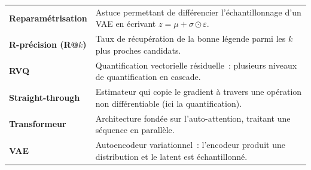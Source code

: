 \documentclass[12pt,a4paper,oneside]{report}
\theoremstyle{definition}
\theoremstyle{plain}
\begin{document}
\begin{longtable}{@{}p{3.6cm}p{11cm}@{}}
\textbf{Reparamétrisation} & Astuce permettant de différencier l'échantillonnage
d'un VAE en écrivant $z=\mu+\sigma\odot\varepsilon$. \\
\textbf{R-précision (R@$k$)} & Taux de récupération de la bonne légende parmi les
$k$ plus proches candidats. \\
\textbf{RVQ} & Quantification vectorielle résiduelle~: plusieurs niveaux de
quantification en cascade. \\
\textbf{Straight-through} & Estimateur qui copie le gradient à travers une opération
non différentiable (ici la quantification). \\
\textbf{Transformeur} & Architecture fondée sur l'auto-attention, traitant une
séquence en parallèle. \\
\textbf{VAE} & Autoencodeur variationnel~: l'encodeur produit une distribution et le
latent est échantillonné. \\
\end{longtable}
\endgroup




\end{document}
